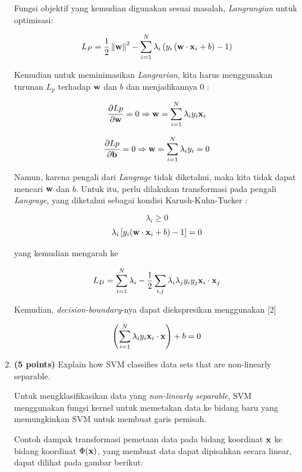 \documentclass[12pt]{article}%
\begin{document}
\begin{enumerate}
	\par Fungsi objektif yang kemudian digunakan sesuai masalah, \textit{Langrangian} untuk optimisasi:

	\[L_P = \frac{1}{2}\left \| \textup{\textbf{w}} \right \|^2 - \sum_{i=1}^{N}\lambda_i\left ( y_i\left ( \textup{\textbf{w}} \cdot \textup{\textbf{x}}_i + b \right ) -1 \right )\]

	\par Kemudian untuk meminimasikan \textit{Langrarian}, kita harus menggunakan turunan $L_p$ terhadap $\textup{\textbf{w}}$ dan $b$ dan menjadikannya 0 :

	\[\frac{\partial Lp }{\partial\textup{\textbf{w}}} = 0 \Rightarrow \textup{\textbf{w}} = \sum_{i=1}^{N} \lambda_i y_i \textup{\textbf{x}}_i\]

	\[\frac{\partial Lp }{\partial\textup{\textbf{b}}} = 0 \Rightarrow \textup{\textbf{w}} = \sum_{i=1}^{N} \lambda_i y_i = 0\]
 
	\par Namun, karena pengali dari \textit{Langrage} tidak diketahui, maka kita tidak dapat mencari $\textup{\textbf{w}}$ dan $b$. Untuk itu, perlu dilakukan transformasi pada pengali \textit{Langrage}, yang diketahui sebagai kondisi Karush-Kuhn-Tucker : 

		\[\lambda_i \geq 0\]
		\[\lambda_i \left [ y_i(\textup{\textbf{w}} \cdot \textup{\textbf{x}}_i + b) -1 \right ] = 0\]

	\par yang kemudian mengarah ke

		\[L_D = \sum_{i=1}^{N} \lambda_i - \frac{1}{2} \sum_{i,j} \lambda_i \lambda_j y_i y_j \textup{\textbf{x}}_i \cdot \textup{\textbf{x}}_j\]

	\par Kemudian, \textit{decision-boundary}-nya dapat diekspresikan menggunakan [2]

		\[\left ( \sum_{i=1}^{N} \lambda_i y_i\textup{\textbf{x}}_i \cdot \textup{\textbf{x}} \right ) + b = 0\]

	\item \textbf{(5 points)} Explain how SVM classifies data sets that are non-linearly separable.
	\par Untuk mengklasifikasikan data yang \textit{non-linearly separable}, SVM menggunakan fungsi kernel untuk memetakan data ke bidang baru yang memungkinkan SVM untuk membuat garis pemisah.

	\par Contoh dampak transformasi pemetaan data pada bidang koordinat $\textup{\textbf{x}}$ ke bidang koordinat $\Phi (\textup{\textbf{x}})$, yang membuat data dapat dipisahkan secara linear, dapat dilihat pada gambar berikut:


\end{enumerate}
\end{document}
